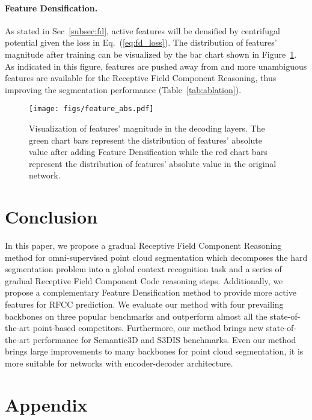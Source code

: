 \documentclass[final]{cvpr}
\begin{document}
\paragraph{Feature Densification.}

As stated in Sec~\ref{subsec:fd}, active features will be densified by centrifugal potential given the loss in Eq.~(\ref{eq:fd_loss}). The distribution of features' magnitude after training can be visualized by the bar chart shown in Figure~\ref{fig:magnitude}. As indicated in this figure, features are pushed away from  and more unambiguous features are available for the Receptive Field Component Reasoning, thus improving the segmentation performance (Table~\ref{tab:ablation}).

\begin{figure}[ht]
    \centering
    \texttt{[image: figs/feature\_abs.pdf]}
    \caption{Visualization of features' magnitude in the decoding layers. The green chart bars represent the distribution of features' absolute value after adding Feature Densification while the red chart bars represent the distribution of features' absolute value in the original network.}
    \label{fig:magnitude}
\end{figure}

\section{Conclusion}
In this paper, we propose a gradual Receptive Field Component Reasoning method for omni-supervised point cloud segmentation which decomposes the hard segmentation problem into a global context recognition task and a series of gradual Receptive Field Component Code reasoning steps. Additionally, we propose a complementary Feature Densification method to provide more active features for RFCC prediction. We evaluate our method with four prevailing backbones on three popular benchmarks and outperform almost all the state-of-the-art point-based competitors. Furthermore, our method brings new state-of-the-art performance for Semantic3D and S3DIS benchmarks. Even our method brings large improvements to many backbones for point cloud segmentation, it is more suitable for networks with encoder-decoder architecture.



{\small


}
\newpage
\appendix
\section*{Appendix}
\end{document}
